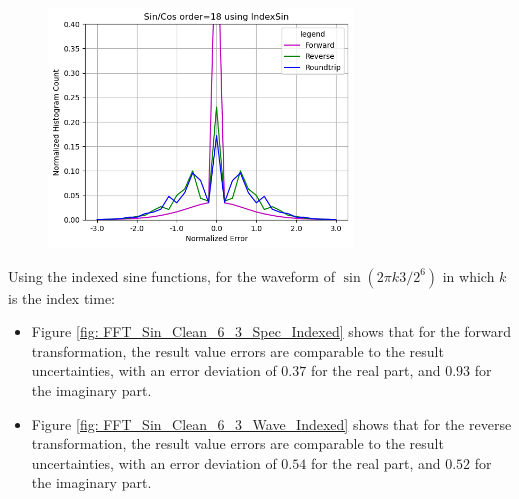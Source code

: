 \documentclass[twoside]{article}
\numberwithin{equation}{section}
\begin{document}
\begin{figure}[p]
\centering
\includegraphics[height=2.5in]{FFT_SinCos_Clean_Histo_Indexed.png} 
\label{fig: FFT_SinCos_Clean_Histo_Indexed}
\end{figure}

Using the indexed sine functions, for the waveform of $\sin(2\pi k 3/2^6)$ in which $k$ is the index time:
\begin{itemize}
\item Figure \ref{fig: FFT_Sin_Clean_6_3_Spec_Indexed} shows that for the forward transformation,  the result value errors are comparable to the result uncertainties, with an error deviation of $0.37$ for the real part, and $0.93$ for the imaginary part.

\item Figure \ref{fig: FFT_Sin_Clean_6_3_Wave_Indexed} shows that for the reverse transformation, the result value errors are comparable to the result uncertainties, with an error deviation of $0.54$ for the real part, and $0.52$ for the imaginary part.

\end{itemize}
\end{document}
